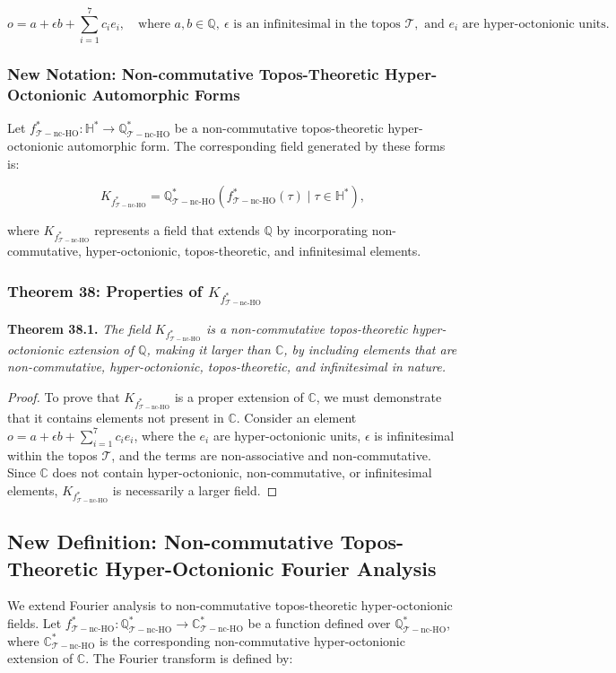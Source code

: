 \documentclass{article}
\begin{document}
\[
o = a + \epsilon b + \sum_{i=1}^{7} c_i e_i, \quad \text{where } a, b \in \mathbb{Q}, \ \epsilon \text{ is an infinitesimal in the topos } \mathcal{T}, \text{ and } e_i \text{ are hyper-octonionic units}.
\]

\subsubsection{New Notation: Non-commutative Topos-Theoretic Hyper-Octonionic Automorphic Forms}
Let \(f_{\mathcal{T}-\text{nc-HO}}^*: \mathbb{H}^* \to \mathbb{Q}_{\mathcal{T}-\text{nc-HO}}^*\) be a non-commutative topos-theoretic hyper-octonionic automorphic form. The corresponding field generated by these forms is:

\[
K_{f_{\mathcal{T}-\text{nc-HO}}^*} = \mathbb{Q}_{\mathcal{T}-\text{nc-HO}}^*(f_{\mathcal{T}-\text{nc-HO}}^*(\tau) \mid \tau \in \mathbb{H}^*),
\]

where \(K_{f_{\mathcal{T}-\text{nc-HO}}^*}\) represents a field that extends \(\mathbb{Q}\) by incorporating non-commutative, hyper-octonionic, topos-theoretic, and infinitesimal elements.

\subsubsection{Theorem 38: Properties of \(K_{f_{\mathcal{T}-\text{nc-HO}}^*}\)}
\textbf{Theorem 38.1.} \textit{The field \(K_{f_{\mathcal{T}-\text{nc-HO}}^*}\) is a non-commutative topos-theoretic hyper-octonionic extension of \(\mathbb{Q}\), making it larger than \(\mathbb{C}\), by including elements that are non-commutative, hyper-octonionic, topos-theoretic, and infinitesimal in nature.}

\begin{proof}
To prove that \(K_{f_{\mathcal{T}-\text{nc-HO}}^*}\) is a proper extension of \(\mathbb{C}\), we must demonstrate that it contains elements not present in \(\mathbb{C}\). Consider an element \(o = a + \epsilon b + \sum_{i=1}^{7} c_i e_i\), where the \(e_i\) are hyper-octonionic units, \(\epsilon\) is infinitesimal within the topos \(\mathcal{T}\), and the terms are non-associative and non-commutative. Since \(\mathbb{C}\) does not contain hyper-octonionic, non-commutative, or infinitesimal elements, \(K_{f_{\mathcal{T}-\text{nc-HO}}^*}\) is necessarily a larger field.
\end{proof}

\subsection{New Definition: Non-commutative Topos-Theoretic Hyper-Octonionic Fourier Analysis}
We extend Fourier analysis to non-commutative topos-theoretic hyper-octonionic fields. Let \(f_{\mathcal{T}-\text{nc-HO}}^*: \mathbb{Q}_{\mathcal{T}-\text{nc-HO}}^* \to \mathbb{C}_{\mathcal{T}-\text{nc-HO}}^*\) be a function defined over \(\mathbb{Q}_{\mathcal{T}-\text{nc-HO}}^*\), where \(\mathbb{C}_{\mathcal{T}-\text{nc-HO}}^*\) is the corresponding non-commutative hyper-octonionic extension of \(\mathbb{C}\). The Fourier transform is defined by:
\end{document}
